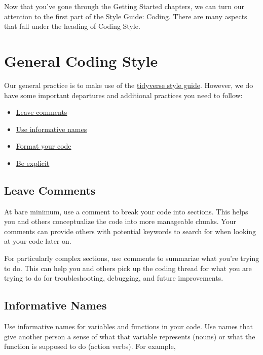 \documentclass[
]{book}
\providecommand{\tightlist}{%
  \setlength{\itemsep}{0pt}\setlength{\parskip}{0pt}}
\begin{document}
Now that you've gone through the Getting Started chapters, we can turn our attention to the first part of the Style Guide: Coding. There are many aspects that fall under the heading of Coding Style.

\hypertarget{genCodeb}{%
\section{General Coding Style}\label{genCodeb}}

Our general practice is to make use of the \href{https://style.tidyverse.org/}{tidyverse style guide}. However, we do have some important departures and additional practices you need to follow:

\begin{itemize}
\tightlist
\item
  \protect\hyperlink{commentsb}{Leave comments}
\item
  \protect\hyperlink{namingb}{Use informative names}
\item
  \protect\hyperlink{formatCodeb}{Format your code}
\item
  \protect\hyperlink{explicitb}{Be explicit}
\end{itemize}

\hypertarget{commentsb}{%
\subsection{Leave Comments}\label{commentsb}}

At bare minimum, use a comment to break your code into sections. This helps you and others conceptualize the code into more manageable chunks. Your comments can provide others with potential keywords to search for when looking at your code later on.

For particularly complex sections, use comments to summarize what you're trying to do. This can help you and others pick up the coding thread for what you are trying to do for troubleshooting, debugging, and future improvements.

\hypertarget{namingb}{%
\subsection{Informative Names}\label{namingb}}

Use informative names for variables and functions in your code. Use names that give another person a sense of what that variable represents (nouns) or what the function is supposed to do (action verbs). For example,
\end{document}
